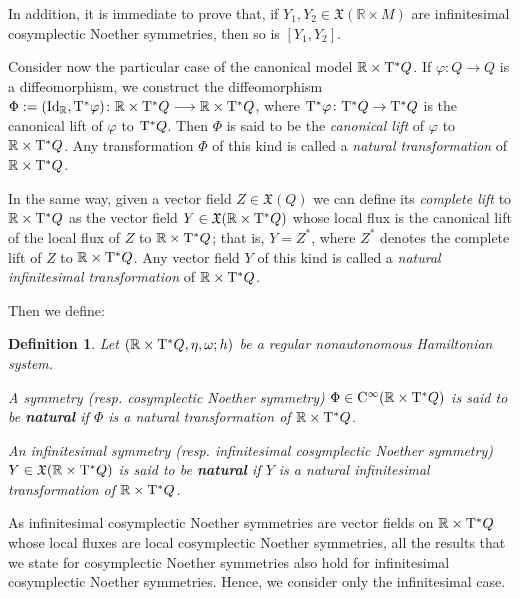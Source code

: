 \documentclass[12pt]{report}
\newtheorem{definition}[teor]{Definition}
\def\vf{\mathfrak X}
\def\Real{\mathbb{R}}
\def\Tan{{\rm T}}
\def\Cinfty{{\rm C}^\infty}
\begin{document}
In addition, it is immediate to prove that, if $Y_1,Y_2\in\vf(\Real\times M)$
are infinitesimal cosymplectic Noether symmetries, then so is $[Y_1,Y_2]$.

\bigskip
Consider now the particular case of the canonical model $\Real\times\Tan^*Q$.
If $\varphi\colon Q\to Q$ is a diffeomorphism,
we construct the diffeomorphism 
$\Phi:=({\rm {\rm Id}_{\mathbb R}},\Tan^*\varphi) \colon
\Real\times\Tan^*Q\longrightarrow \Real\times\Tan^*Q$,
where $\Tan^*\varphi\colon\Tan^*Q\to\Tan^*Q$
is the canonical lift of $\varphi$ to $\Tan^*Q$.
Then $\Phi$ is said to be the {\sl canonical lift} of $\varphi$ to $\Real\times\Tan^*Q$.
Any transformation $\Phi$ of this kind is called a {\sl natural transformation} of $\Real\times\Tan^*Q$.

In the same way, given a vector field $Z\in \vf(Q)$
we can define its {\sl complete lift}
to $\Real\times\Tan^*Q$ as the vector field
$Y\in\vf(\Real\times\Tan^*Q)$
whose local flux is the canonical lift of 
the local flux of $Z$ to $\Real\times\Tan^*Q$; 
that is, $Y=Z^*$,
where $Z^*$ denotes the complete lift of $Z$ to $\Real\times\Tan^*Q$.
Any vector field $Y$ of this kind is called a {\sl natural infinitesimal transformation} of $\Real\times\Tan^*Q$.

Then we define:

\begin{definition}
Let $(\Real\times\Tan^*Q,\eta,\omega;h)$ be a regular nonautonomous Hamiltonian system.

A symmetry (resp. cosymplectic Noether symmetry) $\Phi\in\Cinfty(\Real\times\Tan^*Q)$
is said to be \textbf{natural} if $\Phi$ is a natural transformation of $\Real\times\Tan^*Q$.

An infinitesimal symmetry (resp. infinitesimal cosymplectic Noether symmetry) $Y\in\vf( \Real\times\Tan^*Q)$
is said to be \textbf{natural} if $Y$ is a natural infinitesimal transformation of $\Real\times\Tan^*Q$.
\end{definition}

As infinitesimal cosymplectic Noether symmetries
are vector fields on $\Real\times\Tan^*Q$
whose local fluxes are local cosymplectic Noether symmetries,
all the results that we state
for cosymplectic Noether symmetries also hold for
infinitesimal cosymplectic Noether symmetries.
Hence, we consider only the infinitesimal case.
\end{document}
